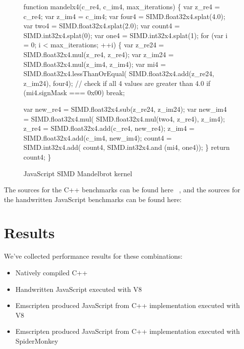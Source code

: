 \documentclass[preprint]{sigplanconf}
\begin{document}
\begin{figure}
\begin{small}
\begin{program}[style=tt, number=true]
fu\tab{}nction mandelx4(c\_re4, c\_im4, max\_iterations) \{
  var z\_re4  = c\_re4;
  var z\_im4  = c\_im4;
  var four4  = SIMD.float32x4.splat(4.0);
  var two4   = SIMD.float32x4.splat(2.0);
  var count4 = SIMD.int32x4.splat(0);
  var one4   = SIMD.int32x4.splat(1);
  fo\tab{}r (var i = 0; i < max\_iterations; ++i) \{
    var z\_re24 = SIMD.float32x4.mul(z\_re4, z\_re4);
    var z\_im24 = SIMD.float32x4.mul(z\_im4, z\_im4);
    var mi4    = SI\tab{}MD.float32x4.lessThanOrEqual(
                   SIMD.float32x4.add(z\_re24, z\_im24), four4);\untab{}
    // check if all 4 values are greater than 4.0
    if\tab{} (mi4.signMask === 0x00)
      break;\untab{}

    var new\_re4 = SIMD.float32x4.sub(z\_re24, z\_im24);
    va\tab{}r new\_im4 = SIMD.float32x4.mul(
      SIMD.float32x4.mul(two4, z\_re4), z\_im4);\untab{}
    z\_re4       = SIMD.float32x4.add(c\_re4, new\_re4);
    z\_im4       = SIMD.float32x4.add(c\_im4, new\_im4);
    co\tab{}unt4      = SIMD.int32x4.add(
      count4, SIMD.int32x4.and (mi4, one4));\untab{}\untab{}
  \}
  return count4;\untab{}
\}
\end{program}
\end{small}
\caption{JavaScript SIMD Mandelbrot kernel}
\label{fig:mandel-js}
\end{figure}

The sources for the C++ benchmarks can be found here ~\cite{github-benchcpp}, and the sources
for the handwritten JavaScript benchmarks can be found here: ~\cite{github-benchjs}

\section{Results}

We've collected performance results for these combinations:

\begin{itemize}
\item
Natively compiled C++

\item
Handwritten JavaScript executed with V8

\item
Emscripten produced JavaScript from C++ implementation executed with V8

\item
Emscripten produced JavaScript from C++ implementation executed with
SpiderMonkey
\end{itemize}
\end{document}
